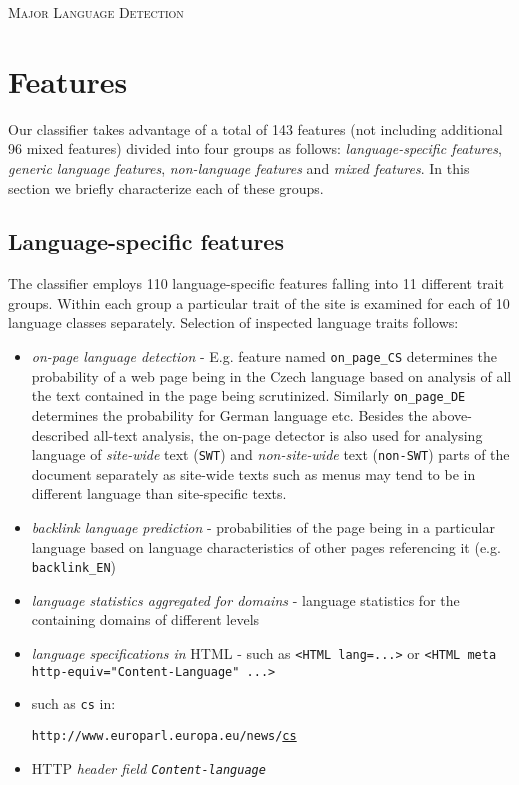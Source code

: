 \documentclass[12pt,a4paper]{article}			%
\begin{document}
	\begin{center}	
		\textsc{\Large Major Language Detection}
	\end{center}

  \section{Features}
  Our classifier takes advantage of a total of 143 features (not including additional 96 mixed features) divided into four groups
  as follows: \textit{language-specific features}, \textit{generic language features}, \textit{non-language
  features} and \textit{mixed features}. In this section we briefly characterize each of these
  groups.

  \subsection{Language-specific features}

  The classifier employs 110 language-specific features falling into 11 different trait groups. Within each group a
  particular trait of the site is examined for each of 10 language classes separately. Selection of
  inspected language traits follows: 
  \begin{itemize}
    \item \textit{on-page language detection} - E.g. feature named \texttt{on\_page\_CS} determines the
      probability of a web page being in the Czech language based on analysis of all the text
      contained in the page being scrutinized. Similarly \texttt{on\_page\_DE} determines the
      probability for German language etc. Besides the above-described all-text analysis, the on-page 
      detector is also used for analysing language of \textit{site-wide} text (\texttt{SWT}) and
    \textit{non-site-wide} text (\texttt{non-SWT}) parts of the document separately as site-wide texts 
      such as menus may tend to be in different language than site-specific texts.
    \item \textit{backlink language prediction} - probabilities of the page being in a particular
      language based on language characteristics of other pages referencing it (e.g.
      \texttt{backlink\_EN})
    \item \textit{language statistics aggregated for domains} - language statistics for the
      containing domains of different levels
  \item \textit{language specifications in} HTML - such as \texttt{<HTML lang=...>} or \texttt{<HTML
      meta http-equiv="Content-Language" ...>}
    \item {} such as \texttt{cs} in:

    \texttt{http://www.europarl.europa.eu/news/}\underline{\texttt{cs}} 
  \item HTTP \textit{header field \texttt{Content-language}}
  \end{itemize}
\end{document}
